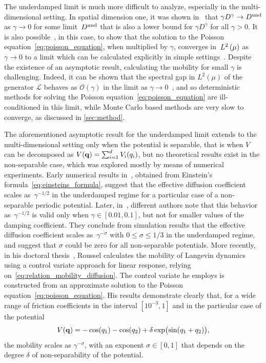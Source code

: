 \documentclass[11pt,a4paper]{article}
\begin{document}
The underdamped limit is much more difficult to analyze,
especially in the multi-dimensional setting.
In spatial dimension one, it was shown in~\cite{MR2394704} that $\gamma D^{\gamma} \to D^{\rm und}$ as $\gamma \to 0$ for some limit~$D^{\rm und}$
that is also a lower bound for $\gamma D^{\gamma}$ for all $\gamma > 0$.
It is also possible~\cite[Lemma~3.4]{MR2394704}, in this case,
to show that the solution to the Poisson equation~\eqref{eq:poisson_equation},
when multiplied by $\gamma$, converges in~$\lp{2}{\mu}$ as $\gamma \to 0$ to a limit
which can be calculated explicitly in simple settings~\cite{MR2427108}.
Despite the existence of an asymptotic result,
calculating the mobility for small $\gamma$ is challenging.
Indeed, it can be shown that the spectral gap in $L^2(\mu)$ of the generator $\mathcal L$ behaves as $\mathcal O(\gamma)$ in the limit as $\gamma \to 0$~\cite{MR2394704},
and so deterministic methods for solving the Poisson equation~\eqref{eq:poisson_equation} are ill-conditioned in this limit,
while Monte Carlo based methods are very slow to converge,
as discussed in \cref{sec:method}.

The aforementioned asymptotic result for the underdamped limit extends to the multi-dimensional setting only when the potential is separable,
that is when $V$ can be decomposed as $V(\boldsymbol{\mathbf q}) = \sum_{i=1}^d V_i(q_i)$,
but no theoretical results exist in the non-separable case,
which was explored mostly by means of numerical experiments.
Early numerical results in~\cite{chen1996surface}, obtained from Einstein's formula~\eqref{eq:einsteins_formula},
suggest that the effective diffusion coefficient scales as~$\gamma^{-1/2}$ in the underdamped regime for a particular case of a non-separable periodic potential.
Later, in~\cite{Braun02},
different authors note that this behavior as~$\gamma^{-1/2}$ is valid only when $\gamma \in [0.01, 0.1]$,
but not for smaller values of the damping coefficient.
They conclude from simulation results that the effective diffusion coefficient scales as~$\gamma^{-\sigma}$ with $0 \leq \sigma \leq 1/3$ in the underdamped regime,
and suggest that $\sigma$ could be zero for all non-separable potentials.
More recently, in his doctoral thesis~\cite{roussel_thesis},
Roussel calculates the mobility of Langevin dynamics using a control variate approach for linear response,
relying on~\eqref{eq:relation_mobility_diffusion}.
The control variate he employs is constructed from an approximate solution to the Poisson equation~\eqref{eq:poisson_equation}.
His results demonstrate clearly that, for a wide range of friction coefficients in the interval $[10^{-3}, 1]$
and in the particular case of the potential
\begin{equation}
    \label{eq:potential_julien}
    V(\boldsymbol{\mathbf q}) = - \cos(q_1) - \cos(q_2) + \delta \exp \bigl(\sin(q_1 + q_2)\bigr),
\end{equation}
the mobility scales as $\gamma^{- \sigma}$,
with an exponent $\sigma \in [0, 1]$ that depends on the degree $\delta$ of non-separability of the potential.
\end{document}
